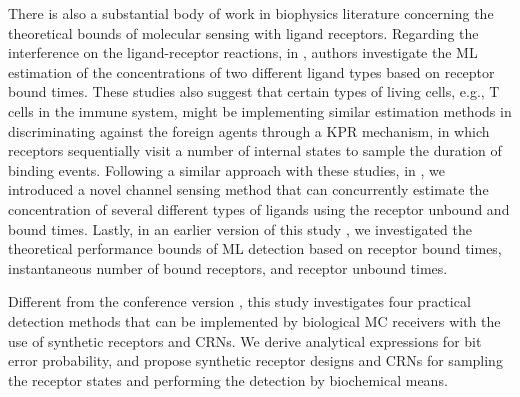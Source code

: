 \documentclass[twocolumn]{IEEEtran}
\begin{document}
There is also a substantial body of work in biophysics literature concerning the theoretical bounds of molecular sensing with ligand receptors. Regarding the interference on the ligand-receptor reactions, in \cite{mora2015physical, singh2017simple, lalanne2015chemodetection, siggia2013decisions}, authors investigate the ML estimation of the concentrations of two different ligand types based on receptor bound times. These studies also suggest that certain types of living cells, e.g., T cells in the immune system, might be implementing similar estimation methods in discriminating against the foreign agents through a KPR mechanism, in which receptors sequentially visit a number of internal states to sample the duration of binding events. Following a similar approach with these studies, in \cite{kuscu2019channel}, we introduced a novel channel sensing method that can concurrently estimate the concentration of several different types of ligands using the receptor unbound and bound times. Lastly, in an earlier version of this study \cite{muzio2018selective}, we investigated the theoretical performance bounds of ML detection based on receptor bound times, instantaneous number of bound receptors, and receptor unbound times. 


Different from the conference version \cite{muzio2018selective}, this study investigates four practical detection methods that can be implemented by biological MC receivers with the use of synthetic receptors and CRNs. We derive analytical expressions for bit error probability, and propose synthetic receptor designs and CRNs for sampling the receptor states and performing the detection by biochemical means.  

\end{document}
